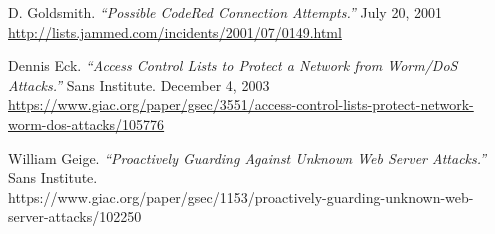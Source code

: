 \begin{thebibliography}{99}
 D. Goldsmith. 
\emph{``Possible CodeRed Connection Attempts.''}
July 20, 2001\\
\url{http://lists.jammed.com/incidents/2001/07/0149.html}

 Dennis Eck.
\emph{``Access Control Lists to Protect a Network from Worm/DoS Attacks.''}
Sans Institute. December 4, 2003\\
\url{https://www.giac.org/paper/gsec/3551/access-control-lists-protect-network-worm-dos-attacks/105776}

 William Geige.
\emph{``Proactively Guarding Against Unknown Web Server Attacks.''}
Sans Institute.\\
https://www.giac.org/paper/gsec/1153/proactively-guarding-unknown-web-server-attacks/102250
\end{thebibliography}
